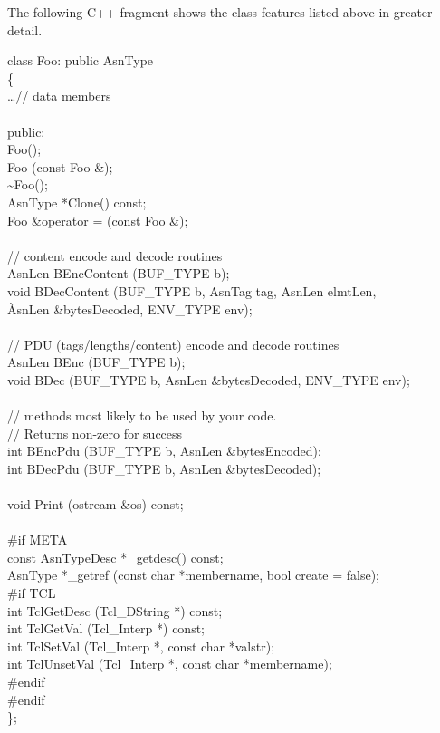 The following C++ fragment shows the class features listed above in greater
detail.
\begin{Ccode}
class Foo: public AsnType\\
\{\+\\
  \dots // data members\\
\\
\<public:\\
          \>\>Foo();\\
          \>\>Foo (const Foo \&);\\
          \>\>\~{}Foo();\\
  AsnType \>\>*Clone() const;\\
  Foo     \>\>\&operator = (const Foo \&);\\
\\
  // content encode and decode routines\\
  AsnLen  \>\>BEncContent (BUF\_TYPE b);\\
  void    \>\>BDecContent (BUF\_TYPE b, AsnTag tag, AsnLen elmtLen,\\
                     \`AsnLen \&bytesDecoded, ENV\_TYPE env);\\
\\
  // PDU (tags/lengths/content) encode and decode routines\\
  AsnLen  \>\>BEnc (BUF\_TYPE b);\\
  void    \>\>BDec (BUF\_TYPE b, AsnLen \&bytesDecoded, ENV\_TYPE env);\\
\\
  // methods most likely to be used by your code.\\
  // Returns non-zero for success\\
  int     \>\>BEncPdu (BUF\_TYPE b, AsnLen \&bytesEncoded);\\
  int     \>\>BDecPdu (BUF\_TYPE b, AsnLen \&bytesDecoded);\\
\\
  void    \>\>Print (ostream \&os) const;\\
\\
\<\#if META\\
  const AsnTypeDesc  \>\>*\_getdesc() const;\\
  AsnType            \>\>*\_getref (const char *membername, bool create = false);\\
\<\#if TCL\\
  int                \>\>TclGetDesc (Tcl\_DString *) const;\\
  int                \>\>TclGetVal (Tcl\_Interp *) const;\\
  int                \>\>TclSetVal (Tcl\_Interp *, const char *valstr);\\
  int                \>\>TclUnsetVal (Tcl\_Interp *, const char *membername);\\
\<\#endif\\
\<\#endif\\
\<\};
\end{Ccode}


